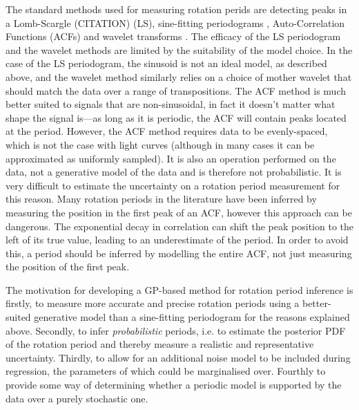 The standard methods used for measuring rotation perids are detecting peaks in
a Lomb-Scargle (CITATION) (LS), sine-fitting periodograms
\citep[e.g.][]{reiners}, Auto-Correlation Functions (ACFs)
\citep{mcquillan2013} and wavelet transforms \citep{garcia2014}.
The efficacy of the LS periodogram and the wavelet methods are limited by the
suitability of the model choice.
In the case of the LS periodogram, the sinusoid is not an ideal model, as
described above, and the wavelet method similarly relies on a choice of mother
wavelet that should match the data over a range of transpositions.
The ACF method is much better suited to signals that are non-sinusoidal, in
fact it doesn't matter what shape the signal is---as long as it is periodic,
the ACF will contain peaks located at the period.
However, the ACF method requires data to be evenly-spaced, which is not the
case with \Kepler light curves (although in many cases it can be approximated
as uniformly sampled).
It is also an operation performed on the data, not a generative model of the
data and is therefore not probabilistic.
It is very difficult to estimate the uncertainty on a rotation period
measurement for this reason.
Many rotation periods in the literature have been inferred by measuring the
position in the first peak of an ACF, however this approach can be dangerous.
The exponential decay in correlation can shift the peak position to the left
of its true value, leading to an underestimate of the period.
In order to avoid this, a period should be inferred by modelling the entire
ACF, not just measuring the position of the first peak.

The motivation for developing a GP-based method for rotation period inference
is firstly, to measure more accurate and precise rotation periods using a
better-suited generative model than a sine-fitting periodogram for the
reasons explained above.
Secondly, to infer {\it probabilistic} periods, i.e. to estimate the
posterior PDF of the rotation period and thereby measure a realistic and
representative uncertainty.
Thirdly, to allow for an additional noise model to be included during
regression, the parameters of which could be marginalised over.
Fourthly to provide some way of determining whether a periodic model is
supported by the data over a purely stochastic one.

